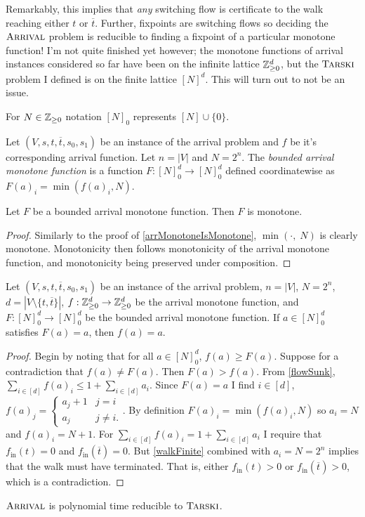   Remarkably, this implies that \emph{any} switching flow is certificate to the walk reaching either $t$
  or $\overline{t}$. Further, fixpoints are switching flows so deciding the $\textsc{Arrival}$ problem is reducible
  to finding a fixpoint of a particular monotone function! I'm not quite finished yet however;
  the monotone functions of arrival instances considered so far have been on the infinite lattice $\mathbb{Z}_{\geq 0}^d$, but
  the $\textsc{Tarski}$ problem I defined is on the finite lattice $[N]^d$. This will turn out to not be an issue.
  \begin{notation}
    For $N \in \mathbb{Z}_{\geq 0}$ notation $[N]_0$ represents $[N] \cup \{0\}$.
  \end{notation}
  \newcommand{\no}{[N]_0}
  \begin{definition}
    Let $(V, s, t, \overline{t}, s_0, s_1)$ be an instance of the arrival problem and $f$
    be it's corresponding arrival function. Let $n = |V|$ and $N = 2^n$. The \emph{bounded arrival monotone function}
    is a function $F : \no^d \to \no^d$ defined coordinatewise as $F(a)_i = \min(f(a)_i, N)$. 
  \end{definition}
  \begin{lemma}
    Let $F$ be a bounded arrival monotone function. Then $F$ is monotone.
  \end{lemma}
  \begin{proof}
    Similarly to the proof of \cref{arrMonotoneIsMonotone}, $\min(\cdot, \; N)$ is clearly monotone.
    Monotonicity then follows monotonicity of the arrival monotone function, and monotonicity
    being preserved under composition.
  \end{proof}
  \begin{lemma}
    Let $(V, s, t, \overline{t}, s_0, s_1)$ be an instance of the arrival problem, 
    $n = |V|$, $N = 2^n$, $d = |V \setminus \{t, \overline{t}\}|$, 
    $f : \mathbb{Z}_{\geq 0}^d \to \mathbb{Z}_{\geq 0}^d$ be the arrival monotone function, and $F : \no^d \to \no^d$
    be the bounded arrival monotone function.
    If $a \in \no^d$ satisfies $F(a) = a$, then $f(a) = a$. 
  \end{lemma}
  \begin{proof}
    Begin by noting that for all $a \in \no^d$, $f(a) \geq F(a)$. Suppose for a contradiction that $f(a) \neq F(a)$.
    Then $F(a) > f(a)$. From \cref{flowSunk},
    $\sum_{i \in [d]} f(a)_i \leq 1 + \sum_{i \in [d]} a_i$. 
    Since $F(a) = a$ I find $i \in [d]$, $f(a)_j = 
    \begin{cases} a_j + 1 & j = i \\ a_j & j \neq i. \end{cases}$. By definition $F(a)_i = \min(f(a)_i, N)$
      so $a_i = N$ and $f(a)_i = N + 1$.
    For $\sum_{i \in [d]} f(a)_i = 1 + \sum_{i \in [d]} a_i$ 
    I require that $f_{\text{in}}(t) = 0$ and $f_{\text{in}}(\overline{t}) = 0$.
    But \cref{walkFinite} combined with $a_i = N = 2^n$ implies that the walk must have terminated. That is,
    either $f_{\text{in}}(t) > 0$ or $f_{\text{in}}(\overline{t}) > 0$, which is a contradiction. 
  \end{proof}
  \begin{theorem}
    $\textsc{Arrival}$ is polynomial time reducible to $\textsc{Tarski}$.
  \end{theorem}
